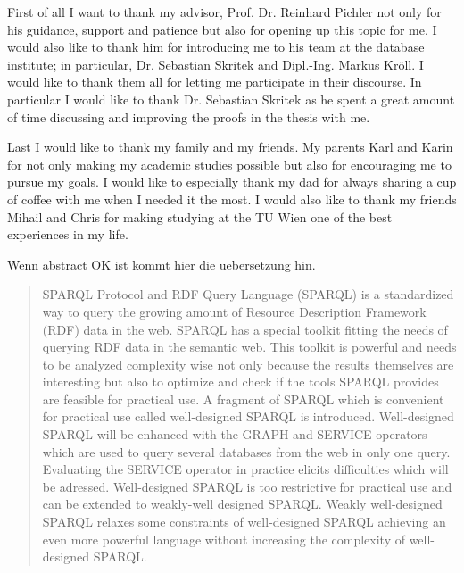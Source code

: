 \documentclass[draft,final]{vutinfth} %
\begin{document}
\frontmatter %

\addstatementpage

\begin{acknowledgements*}
	First of all I want to thank my advisor, Prof. Dr. Reinhard Pichler not only
	for his guidance, support and patience but also for opening up this topic for me.
	I would also like to thank him for introducing me to his team at the
	database institute; in particular,  Dr. Sebastian Skritek and Dipl.-Ing. Markus Kr{\"o}ll. I would like to
	thank them all for letting me participate in their discourse. In particular I would like to thank
	Dr. Sebastian Skritek as he spent a great amount of time discussing and
	improving the proofs in the thesis with me. 

	\noindent
	Last I would like to thank my family and my friends. 
	My parents Karl and Karin for not only making my academic studies possible but
	also for encouraging me to pursue my goals. I would like to especially thank my dad 
	for always sharing a cup of coffee with me when I needed it the most. 
	I would also like to thank my friends Mihail and Chris for making studying
	at the TU Wien one of the best experiences in my life. 
\end{acknowledgements*}

\begin{kurzfassung}
	Wenn abstract OK ist kommt hier die uebersetzung hin.
\end{kurzfassung}

\begin{abstract}
	SPARQL Protocol and RDF Query Language (SPARQL) is a standardized way to
	query the growing amount of Resource Description Framework (RDF) data in the web. SPARQL has a special 
	toolkit fitting the needs of querying RDF data in the semantic web. This toolkit is
	powerful and needs to be analyzed complexity wise not only because the
	results themselves are interesting but also to optimize and check if the
	tools SPARQL provides are feasible for practical use. A 
	fragment of SPARQL which is convenient for practical use called
	well-designed SPARQL is introduced. Well-designed SPARQL will be enhanced with the
	GRAPH and SERVICE operators which are used to query several databases from the
	web in only one query. Evaluating the SERVICE operator in practice elicits
	difficulties which will be adressed. Well-designed SPARQL is too
	restrictive for practical use and can be extended to weakly-well designed SPARQL. 
	Weakly well-designed SPARQL relaxes some constraints of well-designed SPARQL achieving an even
	more powerful language without increasing the complexity of well-designed
	SPARQL.
\end{abstract}
\end{document}
